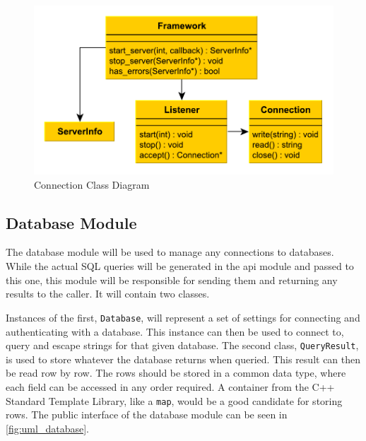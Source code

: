 \begin{figure}[ht]
\begin{center}
\includegraphics[scale=0.8]{img/connection.pdf}
\caption{Connection Class Diagram}
\label{fig:uml_connection}
\end{center}
\end{figure}

\subsection{Database Module}

The database module will be used to manage any connections to databases. While the actual SQL queries will be generated in the \ac{api} module and passed to this one,
this module will be responsible for sending them and returning any results to the caller. It will contain two classes.

Instances of the first, \lstinline|Database|, will represent a set of settings for connecting and authenticating with a database. This instance can then be used to connect to, query and escape strings for that given database.
The second class, \lstinline|QueryResult|, is used to store whatever the database returns when queried. This result can then be read row by row. The rows should be stored in a common data type,
where each field can be accessed in any order required. A container from the C++ Standard Template Library, like a \lstinline|map|, would be a good candidate for storing rows.
The public interface of the database module can be seen in \autoref{fig:uml_database}.

